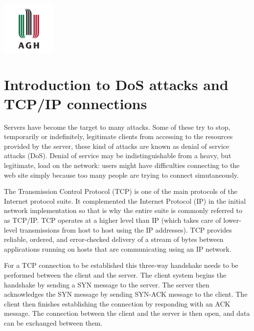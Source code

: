 \documentclass[11pt]{article}
\begin{document}
\begin{titlepage}
	\vfill\vfill
	\includegraphics[width=0.2\textwidth]{agh-logo.png}\\[1cm] %
	 
	
	\vfill %
	
\end{titlepage}


\tableofcontents
\clearpage


\section{Introduction to DoS attacks and TCP/IP connections}
Servers have become the target to many attacks. Some of these try to stop, temporarily or indefinitely, legitimate clients from accessing to the resources provided by the server, these kind of attacks are known as denial of service attacks (DoS). Denial of service may be indistinguishable from a heavy, but legitimate, load on the network: users might have difficulties connecting to the web site simply because too many people are trying to connect simutaneously.\vspace{5mm}

The Transmission Control Protocol (TCP) is one of the main protocols of the Internet protocol suite. It complemented the Internet Protocol (IP) in the initial network implementation so that is why the entire suite is commonly referred to as TCP/IP. TCP operates at a higher level than IP (which takes care of lower-level transmissions from host to host using the IP addresses). TCP provides reliable, ordered, and error-checked delivery of a stream of bytes between applications running on hosts that are communicating using an IP network.\vspace{5mm}

For a TCP connection to be established this three-way handshake needs to be performed between the client and the server. The client system begins the handshake by sending a SYN message to the server. The server then acknowledges the SYN message by sending SYN-ACK message to the client. The client then finishes establishing the connection by responding with an ACK message. The connection between the client and the server is then open, and data can be exchanged between them.\vspace{5mm}
\end{document}
